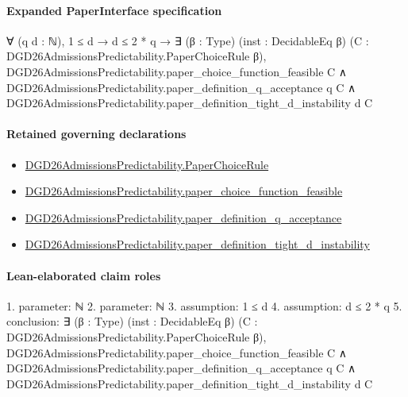 \documentclass[10pt]{article}
\begin{document}
\paragraph{Expanded PaperInterface specification}
\begin{ReviewVerbatim}
∀ (q d : ℕ),
  1 ≤ d →
    d ≤ 2 * q →
      ∃ (β : Type) (inst : DecidableEq β) (C : DGD26AdmissionsPredictability.PaperChoiceRule β),
        DGD26AdmissionsPredictability.paper_choice_function_feasible C ∧
          DGD26AdmissionsPredictability.paper_definition_q_acceptance q C ∧
            DGD26AdmissionsPredictability.paper_definition_tight_d_instability d C
\end{ReviewVerbatim}

\paragraph{Retained governing declarations}
\begin{itemize}\raggedright
\item \hyperlink{governing-declaration-4678951b4432b184}{DGD26\allowbreak{}Admissions\allowbreak{}Predictability.\allowbreak{}Paper\allowbreak{}Choice\allowbreak{}Rule}
\item \hyperlink{governing-declaration-f7de74a44053f6d5}{DGD26\allowbreak{}Admissions\allowbreak{}Predictability.\allowbreak{}paper\_\allowbreak{}choice\_\allowbreak{}function\_\allowbreak{}feasible}
\item \hyperlink{governing-declaration-7ecd62274fb2f391}{DGD26\allowbreak{}Admissions\allowbreak{}Predictability.\allowbreak{}paper\_\allowbreak{}definition\_\allowbreak{}q\_\allowbreak{}acceptance}
\item \hyperlink{governing-declaration-f5c221f0a3041f33}{DGD26\allowbreak{}Admissions\allowbreak{}Predictability.\allowbreak{}paper\_\allowbreak{}definition\_\allowbreak{}tight\_\allowbreak{}d\_\allowbreak{}instability}
\end{itemize}
\paragraph{Lean-elaborated claim roles}\begin{ReviewVerbatim}
1. parameter: ℕ
2. parameter: ℕ
3. assumption: 1 ≤ d
4. assumption: d ≤ 2 * q
5. conclusion: ∃ (β : Type) (inst : DecidableEq β) (C : DGD26AdmissionsPredictability.PaperChoiceRule β),
  DGD26AdmissionsPredictability.paper_choice_function_feasible C ∧
    DGD26AdmissionsPredictability.paper_definition_q_acceptance q C ∧
      DGD26AdmissionsPredictability.paper_definition_tight_d_instability d C
\end{ReviewVerbatim}
\end{document}
